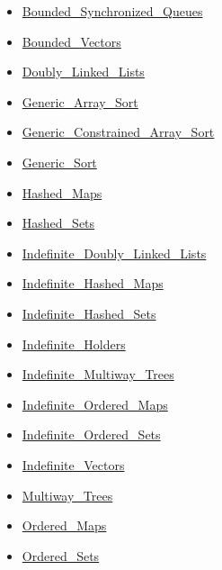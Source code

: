 \begin{multicols*}{\columnnr}
\begin{scriptsize}
\begin{itemize}[leftmargin=0mm]
\begin{itemize}[leftmargin=5mm]
\begin{itemize}[leftmargin=5mm]
	\item[] \href{http://www.ada-auth.org/standards/22rm/html/RM-A-18-29.html}{Bounded\_Synchronized\_Queues}
	\item[] \href{http://www.ada-auth.org/standards/22rm/html/RM-A-18-19.html}{Bounded\_Vectors}
	\item[] \href{http://www.ada-auth.org/standards/22rm/html/RM-A-18-3.html}{Doubly\_Linked\_Lists}
	\item[] \href{http://www.ada-auth.org/standards/22rm/html/RM-A-18-26.html}{Generic\_Array\_Sort}
	\item[] \href{http://www.ada-auth.org/standards/22rm/html/RM-A-18-26.html}{Generic\_Constrained\_Array\_Sort}
	\item[] \href{http://www.ada-auth.org/standards/22rm/html/RM-A-18-26.html}{Generic\_Sort}
	\item[] \href{http://www.ada-auth.org/standards/22rm/html/RM-A-18-5.html}{Hashed\_Maps}
	\item[] \href{http://www.ada-auth.org/standards/22rm/html/RM-A-18-8.html}{Hashed\_Sets}
	\item[] \href{http://www.ada-auth.org/standards/22rm/html/RM-A-18-12.html}{Indefinite\_Doubly\_Linked\_Lists}
	\item[] \href{http://www.ada-auth.org/standards/22rm/html/RM-A-18-13.html}{Indefinite\_Hashed\_Maps}
	\item[] \href{http://www.ada-auth.org/standards/22rm/html/RM-A-18-15.html}{Indefinite\_Hashed\_Sets}
	\item[] \href{http://www.ada-auth.org/standards/22rm/html/RM-A-18-18.html}{Indefinite\_Holders}
	\item[] \href{http://www.ada-auth.org/standards/22rm/html/RM-A-18-17.html}{Indefinite\_Multiway\_Trees}
	\item[] \href{http://www.ada-auth.org/standards/22rm/html/RM-A-18-14.html}{Indefinite\_Ordered\_Maps}
	\item[] \href{http://www.ada-auth.org/standards/22rm/html/RM-A-18-16.html}{Indefinite\_Ordered\_Sets}
	\item[] \href{http://www.ada-auth.org/standards/22rm/html/RM-A-18-11.html}{Indefinite\_Vectors}
	\item[] \href{http://www.ada-auth.org/standards/22rm/html/RM-A-18-10.html}{Multiway\_Trees}
	\item[] \href{http://www.ada-auth.org/standards/22rm/html/RM-A-18-6.html}{Ordered\_Maps}
	\item[] \href{http://www.ada-auth.org/standards/22rm/html/RM-A-18-9.html}{Ordered\_Sets}

\end{itemize}
\end{itemize}
\end{itemize}
\end{scriptsize}
\end{multicols*}

